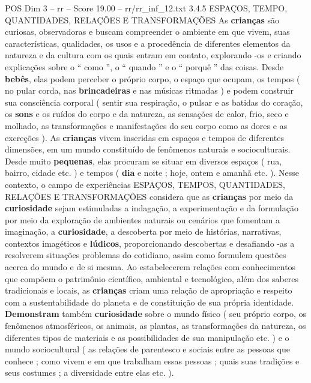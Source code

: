 \begin{textsample}{POS Dim 3 – rr – Score 19.00 – rr/rr\_inf\_12.txt}  \label{ex:f3_pos_223}
3.4.5 ESPAÇOS, TEMPO, QUANTIDADES, RELAÇÕES E TRANSFORMAÇÕES As \textbf{crianças} são curiosas, observadoras e buscam compreender o ambiente em que vivem, suas características, qualidades, os usos e a procedência de diferentes elementos da natureza e da cultura com os quais entram em contato, explorando -os e criando explicações sobre o “ como ”, o “ quando ” e o “ porquê ” das coisas.
Desde \textbf{bebês}, elas podem perceber o próprio corpo, o espaço que ocupam, os tempos ( no pular corda, nas \textbf{brincadeiras} e nas músicas ritmadas ) e podem construir sua consciência corporal ( sentir sua respiração, o pulsar e as batidas do coração, os \textbf{sons} e os ruídos do corpo e da natureza, as sensações de calor, frio, seco e molhado, as transformações e manifestações do seu corpo como as dores e as excreções ).
As \textbf{crianças} vivem inseridas em espaços e tempos de diferentes dimensões, em um mundo constituído de fenômenos naturais e socioculturais.
Desde muito \textbf{pequenas}, elas procuram se situar em diversos espaços ( rua, bairro, cidade etc. ) e tempos ( \textbf{dia} e noite ; hoje, ontem e amanhã etc. ).
Nesse contexto, o campo de experiências ESPAÇOS, TEMPOS, QUANTIDADES, RELAÇÕES E TRANSFORMAÇÕES considera que as \textbf{crianças} por meio da \textbf{curiosidade} sejam estimuladas a indagação, a experimentação e da formulação por meio da exploração de ambientes naturais ou cenários que fomentam a imaginação, a \textbf{curiosidade}, a descoberta por meio de histórias, narrativas, contextos imagéticos e \textbf{lúdicos}, proporcionando descobertas e desafiando -as a resolverem situações problemas do cotidiano, assim como formulem questões acerca do mundo e de si mesma.
Ao estabelecerem relações com conhecimentos que compõem o patrimônio científico, ambiental e tecnológico, além dos saberes tradicionais e locais, as \textbf{crianças} criam uma relação de apropriação e respeito com a sustentabilidade do planeta e de constituição de sua própria identidade. \textbf{Demonstram} também \textbf{curiosidade} sobre o mundo físico ( seu próprio corpo, os fenômenos atmosféricos, os animais, as plantas, as transformações da natureza, os diferentes tipos de materiais e as possibilidades de sua manipulação etc. ) e o mundo sociocultural ( as relações de parentesco e sociais entre as pessoas que conhece ; como vivem e em que trabalham essas pessoas ; quais suas tradições e seus costumes ; a diversidade entre elas etc. ).

\end{textsample}
